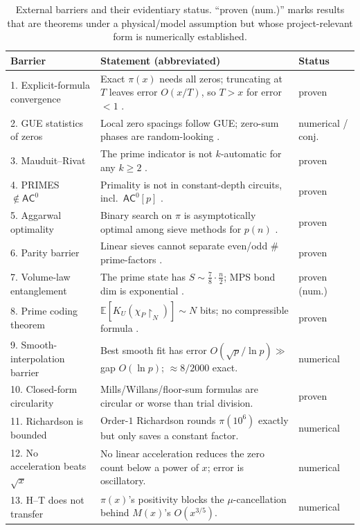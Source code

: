 \documentclass[11pt]{article}
\theoremstyle{plain}
\theoremstyle{definition}
\theoremstyle{remark}
\newcommand{\chiP}{\chi_{P}}
\begin{document}
\begin{table}[t]
\centering
\footnotesize
\renewcommand{\arraystretch}{1.2}
\begin{tabular}{@{}p{3.0cm} p{8.5cm} p{1.9cm}@{}}
\toprule
\textbf{Barrier} & \textbf{Statement (abbreviated)} & \textbf{Status}\\
\midrule
1. Explicit-formula convergence & Exact $\pi(x)$ needs all zeros; truncating at $T$ leaves error $O(x/T)$, so $T>x$ for error ${<}1$ \cite{riemann1859,vonmangoldt}. & proven \\
2. GUE statistics of zeros & Local zero spacings follow GUE; zero-sum phases are random-looking \cite{montgomery1973,odlyzko1987}. & numerical / conj. \\
3. Mauduit--Rivat & The prime indicator is not $k$-automatic for any $k\ge2$ \cite{mauduitrivat2010}. & proven \\
4. PRIMES $\notin\mathsf{AC}^0$ & Primality is not in constant-depth circuits, incl.\ $\mathsf{AC}^0[p]$ \cite{allendersaks2001}. & proven \\
5. Aggarwal optimality & Binary search on $\pi$ is asymptotically optimal among sieve methods for $p(n)$ \cite{aggarwal2025}. & proven \\
6. Parity barrier & Linear sieves cannot separate even/odd $\#$prime-factors \cite{selberg,bombieri1976}. & proven \\
7. Volume-law entanglement & The prime state has $S\sim\tfrac{7}{8}\cdot\tfrac{n}{2}$; MPS bond dim is exponential \cite{latorresierra2014,garciamartin2020}. & proven (num.) \\
8. Prime coding theorem & $\mathbb{E}[K_U(\chiP{\restriction}_N)]\sim N$ bits; no compressible formula \cite{kolpakovrocke2023}. & proven \\
9. Smooth-interpolation barrier & Best smooth fit has error $O(\sqrt{p}/\ln p)\gg$ gap $O(\ln p)$; ${\approx}8/2000$ exact. & numerical \\
10. Closed-form circularity & Mills/Willans/floor-sum formulas are circular or worse than trial division. & proven \\
11. Richardson is bounded & Order-$1$ Richardson rounds $\pi(10^6)$ exactly but only saves a constant factor. & numerical \\
12. No acceleration beats $\sqrt{x}$ & No linear acceleration reduces the zero count below a power of $x$; error is oscillatory. & numerical \\
13. H--T does not transfer & $\pi(x)$'s positivity blocks the $\mu$-cancellation behind $M(x)$'s $O(x^{3/5})$. & numerical \\
\bottomrule
\end{tabular}
\caption{External barriers and their evidentiary status. ``proven (num.)'' marks
results that are theorems under a physical/model assumption but whose
project-relevant form is numerically established.}
\label{tab:barriers}
\end{table}
\end{document}
